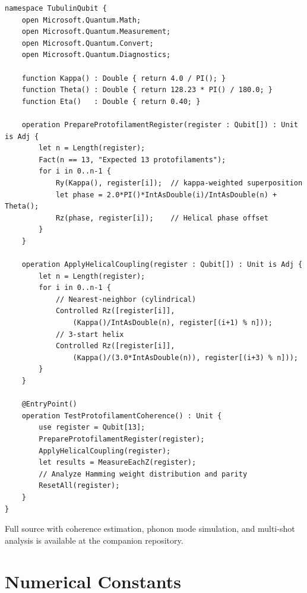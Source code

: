 \documentclass[12pt,a4paper]{article}
\theoremstyle{plain}
\theoremstyle{definition}
\begin{document}
\begin{verbatim}
namespace TubulinQubit {
    open Microsoft.Quantum.Math;
    open Microsoft.Quantum.Measurement;
    open Microsoft.Quantum.Convert;
    open Microsoft.Quantum.Diagnostics;

    function Kappa() : Double { return 4.0 / PI(); }
    function Theta() : Double { return 128.23 * PI() / 180.0; }
    function Eta()   : Double { return 0.40; }

    operation PrepareProtofilamentRegister(register : Qubit[]) : Unit is Adj {
        let n = Length(register);
        Fact(n == 13, "Expected 13 protofilaments");
        for i in 0..n-1 {
            Ry(Kappa(), register[i]);  // kappa-weighted superposition
            let phase = 2.0*PI()*IntAsDouble(i)/IntAsDouble(n) + Theta();
            Rz(phase, register[i]);    // Helical phase offset
        }
    }

    operation ApplyHelicalCoupling(register : Qubit[]) : Unit is Adj {
        let n = Length(register);
        for i in 0..n-1 {
            // Nearest-neighbor (cylindrical)
            Controlled Rz([register[i]],
                (Kappa()/IntAsDouble(n), register[(i+1) % n]));
            // 3-start helix
            Controlled Rz([register[i]],
                (Kappa()/(3.0*IntAsDouble(n)), register[(i+3) % n]));
        }
    }

    @EntryPoint()
    operation TestProtofilamentCoherence() : Unit {
        use register = Qubit[13];
        PrepareProtofilamentRegister(register);
        ApplyHelicalCoupling(register);
        let results = MeasureEachZ(register);
        // Analyze Hamming weight distribution and parity
        ResetAll(register);
    }
}
\end{verbatim}

Full source with coherence estimation, phonon mode simulation, and multi-shot analysis is available at the companion repository.

\section{Numerical Constants}
\label{app:constants}
\end{document}

